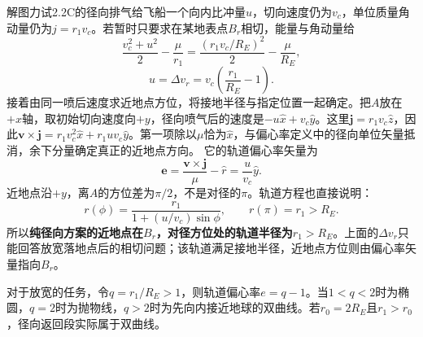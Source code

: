 \documentclass[UTF8,fontset=fandol,a4paper,11pt]{ctexart}
\begin{document}
解图力试2.2C的径向排气给飞船一个向内比冲量$u$，切向速度仍为$v_c$，单位质量角动量仍为$j=r_1v_c$。若暂时只要求在某地表点$B_r$相切，能量与角动量给
\[
\frac{v_c^2+u^2}{2}-\frac{\mu}{r_1}
=\frac{(r_1v_c/R_E)^2}{2}-\frac{\mu}{R_E},
\]
\[
\boxed{u=\Delta v_r=v_c\left(\frac{r_1}{R_E}-1\right)}.
\]
接着由同一喷后速度求近地点方位，将接地半径与指定位置一起确定。把$A$放在$+x$轴，取初始切向速度向$+y$，径向喷气后的速度是$-u\hat x+v_c\hat y$。这里$\boldsymbol j=r_1v_c\hat z$，因此$\boldsymbol v\times\boldsymbol j=r_1v_c^2\hat x+r_1uv_c\hat y$。第一项除以$\mu$恰为$\hat x$，与偏心率定义中的径向单位矢量抵消，余下分量确定真正的近地点方向。
它的轨道偏心率矢量为
\[
\boldsymbol e=\frac{\boldsymbol v\times\boldsymbol j}{\mu}-\hat r
=\frac{u}{v_c}\hat y.
\]
近地点沿$+y$，离$A$的方位差为$\pi/2$，不是对径的$\pi$。轨道方程也直接说明：
\[
r(\phi)=\frac{r_1}{1+(u/v_c)\sin\phi},
\qquad r(\pi)=r_1>R_E.
\]
所以\textbf{纯径向方案的近地点在$B_r$，对径方位处的轨道半径为$r_1>R_E$}。上面的$\Delta v_r$只能回答放宽落地点后的相切问题；该轨道满足接地半径，近地点方位则由偏心率矢量指向$B_r$。

对于放宽的任务，令$q=r_1/R_E>1$，则轨道偏心率$e=q-1$。当$1<q<2$时为椭圆，$q=2$时为抛物线，$q>2$时为先向内接近地球的双曲线。若$r_0=2R_E$且$r_1>r_0$，径向返回段实际属于双曲线。
\end{document}
